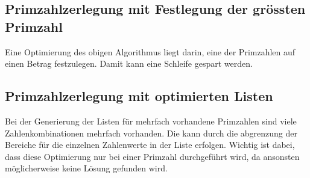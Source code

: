 \documentclass[10pt, fleqn]{article}
\begin{document}
\subsection{Primzahlzerlegung mit Festlegung der grössten Primzahl}
Eine Optimierung des obigen Algorithmus liegt darin, eine der Primzahlen auf 
einen Betrag festzulegen. Damit kann eine Schleife gespart werden. 
% 

\subsection{Primzahlzerlegung mit optimierten Listen}
Bei der Generierung der Listen für mehrfach vorhandene Primzahlen sind viele 
Zahlenkombinationen mehrfach vorhanden. Die kann durch die abgrenzung der 
Bereiche für die einzelnen Zahlenwerte in der Liste erfolgen. Wichtig ist 
dabei, dass diese Optimierung nur bei einer Primzahl durchgeführt wird, da 
ansonsten möglicherweise keine Lösung gefunden wird. 
% 
\end{document}
